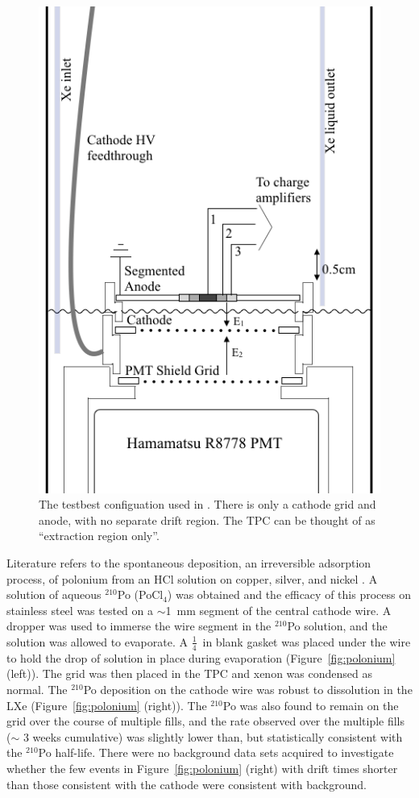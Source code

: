 \begin{figure}[htbp]
\begin{center}
\includegraphics[width=\halffig]{figures/testbed/internals1.png}
\caption{The testbest configuation used in \cite{SorensenKamdin2018}. There is only a cathode grid and anode, with no separate drift region. The \acs{TPC} can be thought of as ``extraction region only''.}
\label{fig:extraction_tpc}
\end{center}
\end{figure}


Literature refers to the spontaneous deposition, an irreversible adsorption process, of polonium from an HCl solution on copper, silver, and nickel \cite{Hashimoto1990} \cite{Figgins1961}. A solution of aqueous $^{210}$Po (PoCl$_{4}$) was obtained and the efficacy of this process on stainless steel was tested on a $\sim$1~mm segment of the central cathode wire. A dropper was used to immerse the wire segment in the $^{210}$Po solution, and the solution was allowed to evaporate. A $\frac{1}{4}$~in blank gasket was placed under the wire to hold the drop of solution in place during evaporation (Figure~\ref{fig:polonium} (left)). The grid was then placed in the \ac{TPC} and xenon was condensed as normal. The $^{210}$Po deposition on the cathode wire was robust to dissolution in the \ac{LXe} (Figure~\ref{fig:polonium} (right)). The $^{210}$Po was also found to remain on the grid over the course of multiple fills, and the rate observed over the multiple fills ($\sim$ 3 weeks cumulative) was slightly lower than, but statistically consistent with the $^{210}$Po half-life. There were no background data sets acquired to investigate whether the few events in Figure~\ref{fig:polonium} (right) with drift times shorter than those consistent with the cathode were consistent with background. 

